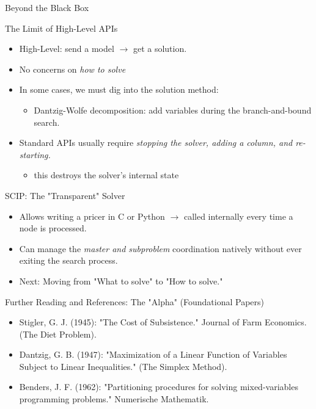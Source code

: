 \documentclass[presentation, aspectratio=169]{beamer}
\begin{document}
\begin{frame}[label={sec:org0a2c5ef}]{Beyond the Black Box}
\begin{block}{The Limit of High-Level APIs}
\begin{itemize}
\item \alert{High-Level}: send a model \(\to\) get a solution.
\item No concerns on \emph{how to solve}
\item In some cases, we must dig into the solution method:
\begin{itemize}
\item Dantzig-Wolfe decomposition: add variables \alert{during} the branch-and-bound search.
\end{itemize}
\item Standard APIs usually require \emph{stopping the solver, adding a column, and re-starting.}
\begin{itemize}
\item this destroys the solver's internal state
\end{itemize}
\end{itemize}
\end{block}

\begin{block}{SCIP: The "Transparent" Solver}
\begin{itemize}
\item Allows writing a \alert{\alert{pricer}} in C or Python \(\to\) called \alert{internally} every time a node is processed.
\item Can manage the \emph{master and subproblem} coordination natively without ever exiting the search process.
\item Next: \alert{Moving from "What to solve" to "How to solve."}
\end{itemize}
\end{block}
\end{frame}


\begin{frame}[label={sec:org7493cf4}]{Further Reading and References: The "Alpha" (Foundational Papers)}
\begin{itemize}
\item \alert{\alert{Stigler, G. J. (1945)}}: "The Cost of Subsistence." \alert{Journal of Farm Economics}. (The Diet Problem).
\item \alert{\alert{Dantzig, G. B. (1947)}}: "Maximization of a Linear Function of Variables Subject to Linear Inequalities." (The Simplex Method).
\item \alert{\alert{Benders, J. F. (1962)}}: "Partitioning procedures for solving mixed-variables programming problems." \alert{Numerische Mathematik}.
\end{itemize}
\end{frame}
\end{document}
